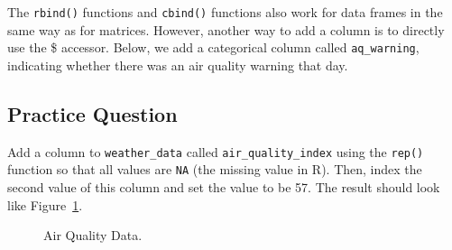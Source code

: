 \documentclass[
  letterpaper,
]{krantz}
\makeatletter
\newenvironment{Shaded}{\begin{snugshade}}{\end{snugshade}}
\newcommand{\CommentTok}[1]{\textcolor[rgb]{0.37,0.37,0.37}{#1}}
\newcommand{\DecValTok}[1]{\textcolor[rgb]{0.68,0.00,0.00}{#1}}
\newcommand{\FunctionTok}[1]{\textcolor[rgb]{0.28,0.35,0.67}{#1}}
\newcommand{\NormalTok}[1]{\textcolor[rgb]{0.00,0.23,0.31}{#1}}
\newcommand{\OtherTok}[1]{\textcolor[rgb]{0.00,0.23,0.31}{#1}}
\newcommand{\SpecialCharTok}[1]{\textcolor[rgb]{0.37,0.37,0.37}{#1}}
\newenvironment{kframe}{%
\medskip{}
\setlength{\fboxsep}{.8em}
 \def\at@end@of@kframe{}%
 \ifinner\ifhmode%
  \def\at@end@of@kframe{\end{minipage}}%
  \begin{minipage}{\columnwidth}%
 \fi\fi%
 \def\FrameCommand##1{\hskip\@totalleftmargin \hskip-\fboxsep
 \colorbox{shadecolor}{##1}\hskip-\fboxsep
     \hskip-\linewidth \hskip-\@totalleftmargin \hskip\columnwidth}%
 \MakeFramed {\advance\hsize-\width
   \@totalleftmargin\z@ \linewidth\hsize
   \@setminipage}}%
 {\par\unskip\endMakeFramed%
 \at@end@of@kframe}
\renewenvironment{Shaded}{\begin{kframe}}{\end{kframe}}
\makeatother
\begin{document}
The \texttt{rbind()} functions and \texttt{cbind()} functions also work
for data frames in the same way as for matrices. However, another way to
add a column is to directly use the \$ accessor. Below, we add a
categorical column called \texttt{aq\_warning}, indicating whether there
was an air quality warning that day.

\begin{Shaded}
\end{Shaded}

\subsection{Practice Question}\label{practice-question-2}

Add a column to \texttt{weather\_data} called
\texttt{air\_quality\_index} using the \texttt{rep()} function so that
all values are \texttt{NA} (the missing value in R). Then, index the
second value of this column and set the value to be 57. The result
should look like Figure~\ref{fig-daily-air-quality}.

\begin{figure}


\caption{\label{fig-daily-air-quality}Air Quality Data.}

\end{figure}%
\end{document}
